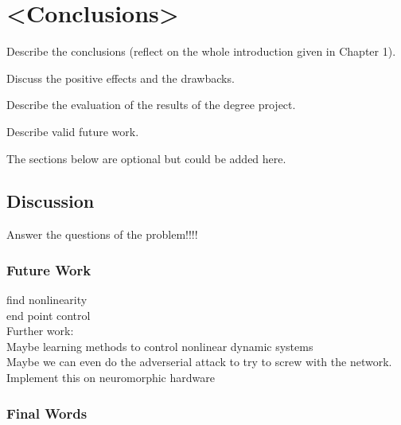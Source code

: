 \chapter{<Conclusions>}
Describe the conclusions (reflect on the whole introduction given in Chapter 1).

Discuss the positive effects and the drawbacks.

Describe the evaluation of the results of the degree project.

Describe valid future work.

The sections below are optional but could be added here.

\section{Discussion}

Answer the questions of the problem!!!!\\

\subsection{Future Work}
find nonlinearity\\
end point control\\


Further work:\\
Maybe learning methods to control nonlinear dynamic systems\\
Maybe we can even do the adverserial attack to try to screw with the network.\\
Implement this on neuromorphic hardware\\

\subsection{Final Words}

\listoftodos






